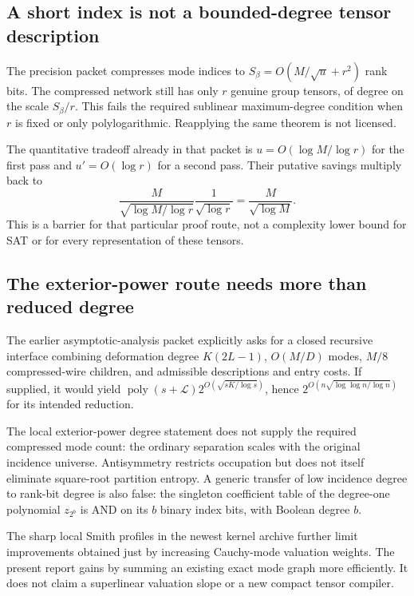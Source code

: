 \documentclass[11pt,letterpaper]{article}
\theoremstyle{remark}\newtheorem{remark}[theorem]{Remark}
\newcommand{\poly}{\operatorname{poly}}
\begin{document}
\subsection{A short index is not a bounded-degree tensor description}

The precision packet compresses mode indices to
$S_\beta=O(M/\sqrt u+r^2)$ rank bits. The compressed network still has
only $r$ genuine group tensors, of degree on the scale $S_\beta/r$.
This fails the required sublinear maximum-degree condition when $r$ is
fixed or only polylogarithmic. Reapplying the same theorem is not licensed.

The quantitative tradeoff already in that packet is
$u=O(\log M/\log r)$ for the first pass and $u'=O(\log r)$ for a second
pass. Their putative savings multiply back to
\[
 \frac M{\sqrt{\log M/\log r}}\frac1{\sqrt{\log r}}
 =\frac M{\sqrt{\log M}}.
\]
This is a barrier for that particular proof route, not a complexity lower
bound for SAT or for every representation of these tensors.

\subsection{The exterior-power route needs more than reduced degree}

The earlier asymptotic-analysis packet explicitly asks for a closed
recursive interface combining deformation degree $K(2L-1)$,
$O(M/D)$ modes, $M/8$ compressed-wire children, and admissible descriptions
and entry costs. If supplied, it would yield
$\poly(s+\mathcal L)2^{O(\sqrt{sK/\log s})}$, hence
$2^{O(n\sqrt{\log\log n/\log n})}$ for its intended reduction.

The local exterior-power degree statement does not supply the required
compressed mode count: the ordinary separation scales with the original
incidence universe. Antisymmetry restricts occupation but does not itself
eliminate square-root partition entropy. A generic transfer of low
incidence degree to rank-bit degree is also false: the singleton
coefficient table of the degree-one polynomial $z_{2^b}$ is AND on its
$b$ binary index bits, with Boolean degree $b$.

The sharp local Smith profiles in the newest kernel archive further limit
improvements obtained just by increasing Cauchy-mode valuation weights.
The present report gains by summing an existing exact mode graph more
efficiently. It does not claim a superlinear valuation slope or a new
compact tensor compiler.
\end{document}

